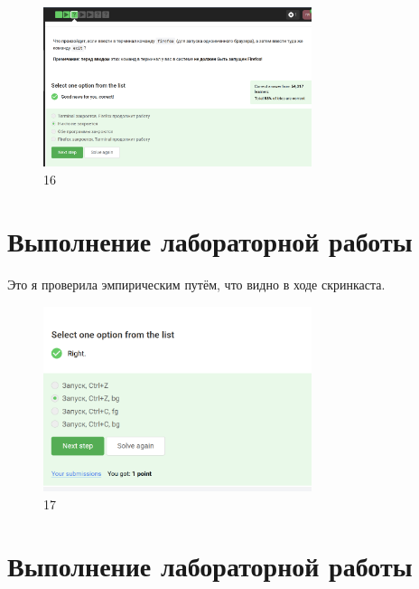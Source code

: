 \begin{figure}
\hypertarget{fig:016}{%
\centering
\includegraphics[width=0.7\textwidth,height=\textheight]{image/16.png}
\caption{16}\label{fig:016}
}
\end{figure}

\hypertarget{ux432ux44bux43fux43eux43bux43dux435ux43dux438ux435-ux43bux430ux431ux43eux440ux430ux442ux43eux440ux43dux43eux439-ux440ux430ux431ux43eux442ux44b-12}{%
\section{Выполнение лабораторной
работы}\label{ux432ux44bux43fux43eux43bux43dux435ux43dux438ux435-ux43bux430ux431ux43eux440ux430ux442ux43eux440ux43dux43eux439-ux440ux430ux431ux43eux442ux44b-12}}

Это я проверила эмпирическим путём, что видно в ходе скринкаста.

\begin{figure}
\hypertarget{fig:017}{%
\centering
\includegraphics[width=0.7\textwidth,height=\textheight]{image/17.png}
\caption{17}\label{fig:017}
}
\end{figure}

\hypertarget{ux432ux44bux43fux43eux43bux43dux435ux43dux438ux435-ux43bux430ux431ux43eux440ux430ux442ux43eux440ux43dux43eux439-ux440ux430ux431ux43eux442ux44b-13}{%
\section{Выполнение лабораторной
работы}\label{ux432ux44bux43fux43eux43bux43dux435ux43dux438ux435-ux43bux430ux431ux43eux440ux430ux442ux43eux440ux43dux43eux439-ux440ux430ux431ux43eux442ux44b-13}}

